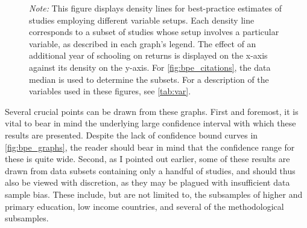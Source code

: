 \begin{figure}[!htbp]
\begin{center}
  \end{center}\vspace{-0.6cm}
  \captionsetup{width=0.78\textwidth, font = scriptsize}
  \caption*{\emph{Note:} This figure displays density lines for best-practice estimates of studies employing different variable setups. Each density line corresponds to a subset of studies whose setup involves a particular variable, as described in each graph's legend. The effect of an additional year of schooling on returns is displayed on the x-axis against its density on the y-axis. For \autoref{fig:bpe_citations}, the data median is used to determine the subsets. For a description of the variables used in these figures, see \autoref{tab:var}.}
\end{figure}

Several crucial points can be drawn from these graphs. First and foremost, it is vital to bear in mind the underlying large confidence interval with which these results are presented. Despite the lack of confidence bound curves in \autoref{fig:bpe_graphs}, the reader should bear in mind that the confidence range for these is quite wide. Second, as I pointed out earlier, some of these results are drawn from data subsets containing only a handful of studies, and should thus also be viewed with discretion, as they may be plagued with insufficient data sample bias. These include, but are not limited to, the subsamples of higher and primary education, low income countries, and several of the methodological subsamples.


